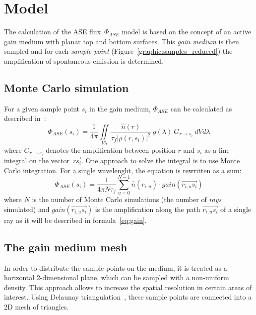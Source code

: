 \section{Model}
The calculation of the ASE flux~$\Phi_{ASE}$ model is based on the concept of an
active gain medium with planar top and bottom surfaces. This \emph{gain medium} is
then sampled and for each \emph{sample point} (Figure~\ref{graphic:samples_reduced}) the amplification of spontaneous emission is
determined. 

\subsection{Monte Carlo simulation}
\label{subsec:monteCarlo}
For a given sample point $s_i$ in the gain medium, $\Phi_{ASE}$ can
be calculated as described in~\cite{ASE2010}:
\begin{equation}
  \label{eq:phi_ase_daniel} 
  \Phi_{ASE}(s_i)=\frac{1}{4\pi}\iint\limits_{V \lambda}
  \frac
    {\hat{n}(r)}
    {\tau_{f}|\rho(r,s_i)|^2}~g(\lambda)~G_{r\rightarrow s_i}~dV d\lambda
\end{equation}
where $G_{r\rightarrow s_i}$ denotes the amplification between
position $r$ and $s_i$ as a line integral on the vector~$\overrightarrow{rs_i}$.
One approach to solve the integral is to use Monte Carlo integration. For a
single wavelenght, the equation is rewritten as a sum:
\begin{equation}
  \label{eq:monte_carlo_ase}
  \Phi_{ASE}(s_i) = 
  \frac{1}{4\pi N\tau_f}
  \sum^{N-1}_{u=0} \hat{n}(r_{i,u}) \cdot gain(\overrightarrow{r_{i,u}s_i})
\end{equation}
where $N$ is the number of Monte Carlo simulations (the number of \emph{rays}
simulated) and $gain(\overrightarrow{r_{i,u}s_i})$ is the amplification along the
path $\overrightarrow{r_{i,u}s_i}$ of a single ray as it will be described in
formula~\eqref{eq:gain}. 


\subsection{The gain medium mesh} \label{subsec:meshSampling}
In order to distribute the sample points on the medium, it is treated as
a horizontal 2-dimensional plane, which can be sampled with a non-uniform
density. This approach allows to increase the spatial resolution in certain
areas of interest. Using Delaunay triangulation~\cite{delaunay_triangulation},
these sample points are connected into a 2D mesh of triangles.

